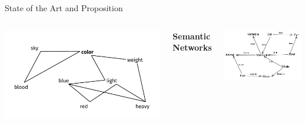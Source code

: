 \documentclass[10pt,xcolor=table]{beamer}
\begin{document}
\begin{frame}{State of the Art and Proposition}
\begin{columns}
\begin{minipage}[c][0.3\textheight][c]{\linewidth}
\includegraphics[width=1\linewidth]{image2/Chapitre2/syn_net1.pdf}
\end{minipage}
\textbf{\normalsize Semantic Networks} 
\begin{minipage}[c][0.3\textheight][c]{\linewidth}
\includegraphics[width=1\linewidth]{image2/Chapitre2/sem_net.pdf}
\end{minipage}
\end{columns}


\end{frame}
\end{document}
